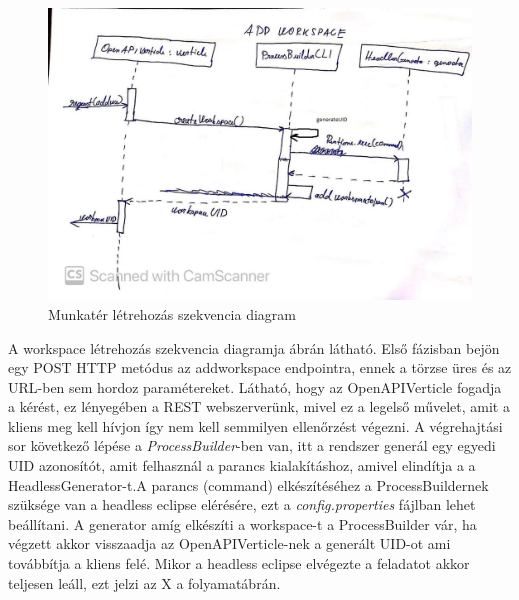 \begin{figure}[!ht]
	\includegraphics[width=150mm, keepaspectratio]{figures/add_workspace_seq.jpg}
	\caption{Munkatér létrehozás szekvencia diagram}
	\label{fig:addworkspace}
\end{figure}

A workspace létrehozás szekvencia diagramja  ábrán látható. Első fázisban bejön egy POST HTTP metódus az addworkspace endpointra, ennek a törzse üres és az URL-ben sem hordoz paramétereket. Látható, hogy az OpenAPIVerticle fogadja a kérést, ez lényegében a REST webszerverünk, mivel ez a legelső művelet, amit a kliens meg kell hívjon így nem kell semmilyen ellenőrzést végezni. A végrehajtási sor következő lépése a \textit{ProcessBuilder}-ben van, itt a rendszer generál egy egyedi UID azonosítót, amit felhasznál a parancs kialakításhoz, amivel elindítja a a HeadlessGenerator-t.A parancs (command) elkészítéséhez a ProcessBuildernek szüksége van a headless eclipse elérésére, ezt a \textit{config.properties} fájlban lehet beállítani. A generator amíg elkészíti a workspace-t a ProcessBuilder vár, ha végzett akkor visszaadja az OpenAPIVerticle-nek a generált UID-ot ami továbbítja a kliens felé. Mikor a headless eclipse elvégezte a feladatot akkor teljesen leáll, ezt jelzi az X a folyamatábrán.


